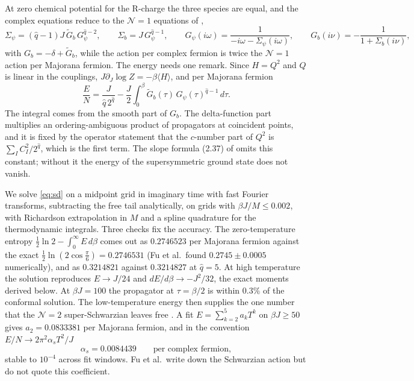 \documentclass[10pt]{article}
\begin{document}
At zero chemical potential for the R-charge the three species are equal, and the complex equations reduce to the
$\mathcal N=1$ equations of \cite{FGMS},
\begin{equation}
\Sigma_\psi=(\hat q-1)J\,\tilde G_b\,G_\psi^{\hat q-2},\qquad \Sigma_b=J\,G_\psi^{\hat q-1},\qquad
G_\psi(i\omega)=\frac1{-i\omega-\Sigma_\psi(i\omega)},\qquad G_b(i\nu)=-\frac1{1+\Sigma_b(i\nu)},
\label{eq:sd}
\end{equation}
with $G_b=-\delta+\tilde G_b$, while the action per complex fermion is twice the $\mathcal N=1$ action per Majorana
fermion. The energy needs one remark. Since $H=Q^2$ and $Q$ is linear in the couplings, $J\partial_J\log
Z=-\beta\langle H\rangle$, and per Majorana fermion
\begin{equation}
\frac EN=\frac J{\hat q\,2^{\hat q}}-\frac J2\int_0^\beta\tilde G_b(\tau)\,G_\psi(\tau)^{\hat q-1}\,d\tau .
\label{eq:energy}
\end{equation}
The integral comes from the smooth part of $G_b$. The delta-function part multiplies an ordering-ambiguous product
of propagators at coincident points, and it is fixed by the operator statement that the $c$-number part of $Q^2$ is
$\sum_IC_I^2/2^{\hat q}$, which is the first term. The slope formula (2.37) of \cite{FGMS} omits this constant;
without it the energy of the supersymmetric ground state does not vanish.

We solve \eqref{eq:sd} on a midpoint grid in imaginary time with fast Fourier transforms, subtracting the free tail
analytically, on grids with $\beta J/M\le0.002$, with Richardson extrapolation in $M$ and a spline quadrature for the
thermodynamic integrals. Three checks fix the accuracy. The zero-temperature entropy
$\frac12\ln2-\int_0^\infty E\,d\beta$ comes out as $0.2746523$ per Majorana fermion against the exact
$\frac12\ln(2\cos\frac\pi6)=0.2746531$ (Fu et al.\ found $0.2745\pm0.0005$ numerically), and as $0.3214821$ against
$0.3214827$ at $\hat q=5$. At high temperature the solution reproduces $E\to J/24$ and $dE/d\beta\to-J^2/32$, the
exact moments derived below. At $\beta J=100$ the propagator at $\tau=\beta/2$ is within $0.3\%$ of the conformal
solution. The low-temperature energy then supplies the one number that the $\mathcal N=2$ super-Schwarzian leaves
free \cite{FGMS}. A fit $E=\sum_{k=2}^5a_kT^k$ on $\beta J\ge50$ gives $a_2=0.0833381$ per Majorana fermion, and in
the convention $E/N\to2\pi^2\alpha_sT^2/J$
\begin{equation}
\alpha_s=0.0084439\qquad\text{per complex fermion},
\end{equation}
stable to $10^{-4}$ across fit windows. Fu et al.\ write down the Schwarzian action but do not quote this
coefficient.
\end{document}
